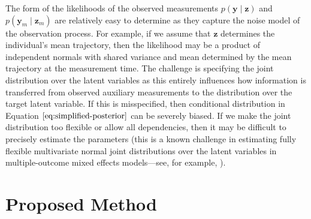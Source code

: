 \documentclass[12pt]{article}
\newcommand{\given}{\mid}
\begin{document}
The form of the likelihoods of the observed measurements $p(\bm{y} \given \bm{z})$ and $p(\bm{y}_m \given \bm{z}_m)$ are relatively easy to determine as they capture the noise model of the observation process. For example, if we assume that $\bm{z}$ determines the individual's mean trajectory, then the likelihood may be a product of independent normals with shared variance and mean determined by the mean trajectory at the measurement time. The challenge is specifying the joint distribution over the latent variables as this entirely influences how information is transferred from observed auxiliary measurements to the distribution over the target latent variable. If this is misspecified, then conditional distribution in Equation $\ref{eq:simplified-posterior}$ can be severely biased. If we make the joint distribution too flexible or allow all dependencies, then it may be difficult to precisely estimate the parameters (this is a known challenge in estimating fully flexible multivariate normal joint distributions over the latent variables in multiple-outcome mixed effects models---see, for example, \cite{Yang2012-vg}).

\section{Proposed Method}
\end{document}
